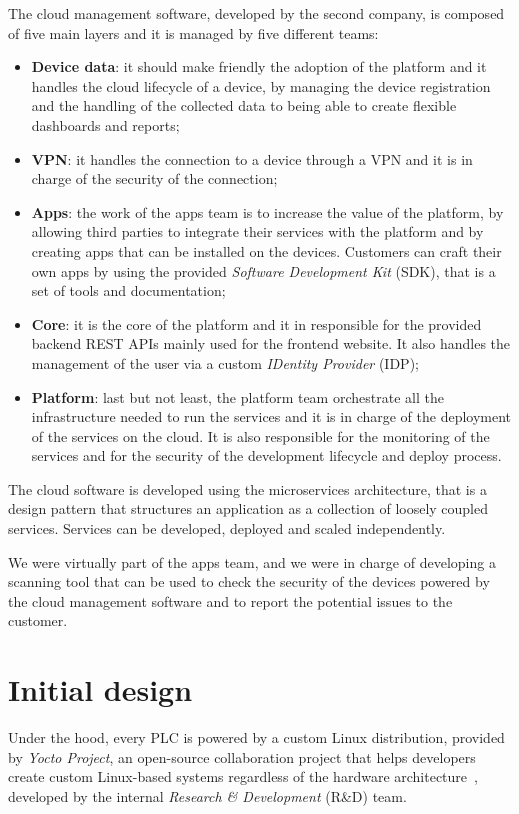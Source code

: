 The cloud management software, developed by the second company, is composed of five main layers and it is managed by five different teams:
\begin{itemize}
  \item \textbf{Device data}: it should make friendly the adoption of the platform and it handles the cloud lifecycle of a device, by managing the device registration and the handling of the collected data to being able to create flexible dashboards and reports;
  \item \textbf{VPN}: it handles the connection to a device through a VPN and it is in charge of the security of the connection;
  \item \textbf{Apps}: the work of the apps team is to increase the value of the platform, by allowing third parties to integrate their services with the platform and by creating apps that can be installed on the devices. Customers can craft their own apps by using the provided \textit{Software Development Kit} (SDK), that is a set of tools and documentation;
  \item \textbf{Core}: it is the core of the platform and it in responsible for the provided backend REST APIs mainly used for the frontend website. It also handles the management of the user via a custom \textit{IDentity Provider} (IDP);
  \item \textbf{Platform}: last but not least, the platform team orchestrate all the infrastructure needed to run the services and it is in charge of the deployment of the services on the cloud. It is also responsible for the monitoring of the services and for the security of the development lifecycle and deploy process.
\end{itemize}

The cloud software is developed using the microservices architecture, that is a design pattern that structures an application as a collection of loosely coupled services. Services can be developed, deployed and scaled independently.

We were virtually part of the apps team, and we were in charge of developing a scanning tool that can be used to check the security of the devices powered by the cloud management software and to report the potential issues to the customer.

\section{Initial design}

Under the hood, every PLC is powered by a custom Linux distribution, provided by \textit{Yocto Project}, an open-source collaboration project that helps developers create custom Linux-based systems regardless of the hardware architecture~\cite{yocto-project}, developed by the internal \textit{Research \& Development} (R\&D) team.

